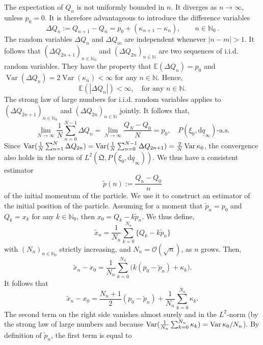 \documentclass[12pt]{article}
\begin{document}
The expectation of $Q_n$ is not uniformly bounded in $n$. It diverges as $n\rightarrow \infty$, unless $p_0 =0$. 
It is therefore advantageous to introduce the difference variables 
\begin{equation}\label{diff variiables}
\Delta Q_n := Q_{n+1}-Q_{n}=p_0+(\kappa_{n+1}-\kappa_n),\qquad n\in \mathbb{N}_0\,.
\end{equation}
The random variables $\Delta Q_n$ and $\Delta Q_m$ are independent whenever $|n-m|>1$. It follows that 
$(\Delta Q_{2n+1})_{n\in \mathbb N_0}$ and $(\Delta Q_{2n})_{n\in \mathbb N}$ are two sequences of 
i.i.d. random variables. They have the property that $\mathbb E(\Delta Q_n)=p_0$ and 
$\operatorname{Var}(\Delta Q_n)=2\operatorname{Var}(\kappa_n)<\infty$ for any $n\in \mathbb N$. Hence,
$$\mathbb E(|\Delta Q_n|)<\infty,\quad \mbox{for any }n\in \mathbb N.$$
The strong law of large numbers for i.i.d. random variables applies to $(\Delta Q_{2n+1})_{n\in \mathbb N_0}$ 
and $(\Delta Q_{2n})_{n\in \mathbb N}$ jointly. It follows that,
\begin{equation}\label{eq:free_part_estim_momentum}
\lim_{N\to\infty}\frac{1}{N} \sum_{n=0}^{N-1} \Delta Q_n =\lim_{N\to\infty} \frac{Q_N-Q_0}{N}= p_0, \quad P(\xi_0,\text{d}\underline{q}_\infty)\text{-a.s.}
\end{equation}
Since $\operatornamewithlimits{Var}(\frac{1}{N} \sum_{n=1}^{N} \Delta Q_{2n})=\operatornamewithlimits{Var}(\frac{1}{N} \sum_{n=0}^{N-1} \Delta Q_{2n+1})=\frac{2}{N}\operatornamewithlimits{Var}\kappa_0$, the convergence 
also holds in the norm of $L^2(\mathfrak{Q}, P(\xi_0,\text{d}\underline{q}_\infty))$.
We thus have a consistent estimator 
$$\tilde p(n):=\frac{Q_n-Q_0}{n}$$
of the initial momentum of the particle. We use it to construct an estimator of the initial position of the particle. Assuming for a moment that $\tilde p_n=p_0$ and $Q_k=x_k$ for any $k\in \mathbb N_0$, then $x_0=Q_k-k\tilde p_n$. We thus define,
$$\tilde x_n=\frac1{N_n}\sum_{k=0}^{N_n} \big\{Q_k-k\tilde p_n \big\}$$
with $(N_n)_{n\in \mathbb{N}_0}$ strictly increasing, and $N_n=\mathcal{O}(\sqrt{n})$, as $n$ grows. Then,
$$\tilde x_n-x_0=\frac1{N_n}\sum_{k=0}^{N_n}\big(k(p_0-\tilde p_n) +\kappa_k\big).$$
It follows that
$$\tilde x_n-x_0=\frac{N_n+1}2(p_0-\tilde p_n) + \frac1{N_n}\sum_{k=0}^{N_n}\kappa_k.$$
The second term on the right side vanishes almost surely and in the $L^2$-norm (by the strong law of large numbers 
and because 
$\operatornamewithlimits{Var}(\frac1{N_n}\sum_{k=0}^{N_n}\kappa_k)=\operatornamewithlimits{Var}\kappa_0/N_n$). 
By definition of $\tilde p_n$, the first term is equal to
\end{document}
